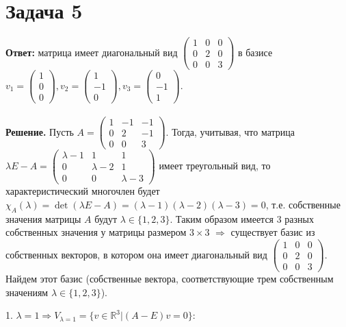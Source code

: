 \documentclass{article}
\begin{document}
\section*{Задача 5}
{\bf Ответ:} матрица имеет диагональный вид $\left(\begin{array}{rrr}1 & 0 & 0\\0 & 2 & 0\\0 & 0 & 3\end{array}\right)$ в базисе $v_1=\left(\begin{array}{r}1\\0\\0\end{array}\right), v_2=\left(\begin{array}{r}1\\-1\\0\end{array}\right), v_3=\left(\begin{array}{r}0\\-1\\1\end{array}\right)$.
\\
\\
{\bf Решение.} Пусть $A=\left(\begin{array}{rrr}1 & -1 & -1\\0 & 2 & -1\\0 & 0 & 3\end{array}\right)$. Тогда, учитывая, что матрица $\lambda E - A = \left(\begin{array}{rrr}\lambda-1 & 1 & 1\\0 & \lambda-2 & 1\\0 & 0 & \lambda-3\end{array}\right)$ имеет треугольный вид, то характеристический многочлен будет $\chi_A(\lambda)=\det(\lambda E - A)=(\lambda - 1)(\lambda - 2)(\lambda - 3)=0$, т.е. собственные значения матрицы $A$ будут $\lambda \in \{1, 2, 3\}$. Таким образом имеется 3 разных собственных значения у матрицы размером $3\times3$  $\Rightarrow$ существует базис из собственных векторов, в котором она имеет диагональный вид $\left(\begin{array}{rrr}1 & 0 & 0\\0 & 2 & 0\\0 & 0 & 3\end{array}\right)$. Найдем этот базис (собственные вектора, соответствующие трем собственным значениям $\lambda \in \{1, 2, 3\}$).
\par
1. $\lambda=1 \Rightarrow V_{\lambda=1}=\{v\in \mathbb{R}^3|(A-E)v=0\}$:
\end{document}
